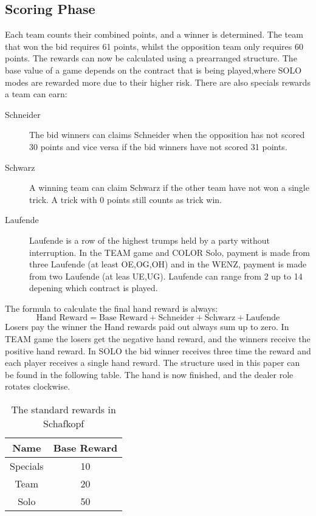 \subsection{Scoring Phase}\label{scoringphase}
Each team counts their combined points, and a winner is determined.
The team that won the bid requires 61 points, whilst the opposition team only requires 60 points.
The rewards can now be calculated using a prearranged structure.
The base value of a game depends on the contract
that is being played,where SOLO modes are rewarded more due to their higher risk.
\newline
There are also specials rewards a team can earn:
\begin{description}
    \item[Schneider] The bid winners can claims Schneider when the opposition has not scored 30 points and vice versa
    if the bid winners have not scored 31 points.
    \item[Schwarz] A winning team can claim Schwarz if the other team have not won a single trick. A trick with 0
    points still counts as trick win.
    \item[Laufende] Laufende is a row of the highest trumps held by a party without interruption.
    In the TEAM game and COLOR Solo, payment is made from three Laufende (at least OE,OG,OH) and in the WENZ,
    payment is made from two Laufende (at leas UE,UG).
    Laufende can range from 2 up to 14 depening which contract is played.
\end{description}
The formula to calculate the final hand reward is always:
\[\text{Hand Reward} = \text{Base Reward} + \text{Schneider} + \text{Schwarz} + \text{Laufende}\]
Losers pay the winner the Hand rewards paid out always sum up to zero.
In TEAM game the losers get the negative hand reward, and the winners receive the positive hand reward.
In SOLO the bid winner receives three time the reward and each player receives a single hand reward.
The structure used in this paper can be found in the following table.
The hand is now finished, and the dealer role rotates clockwise.
\begin{table}[h!]
    \centering
\begin{tabular}{cc}
    \toprule
    Name     & Base Reward \\
    \midrule
    Specials & 10          \\
    Team     & 20          \\
    Solo     & 50          \\
    \bottomrule
\end{tabular}
    \caption{The standard rewards in Schafkopf}
    \label{tab:rewardsStrucutre}
\end{table}
